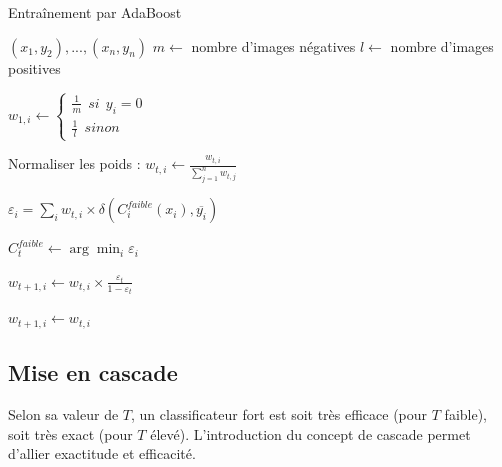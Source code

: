 \documentclass[12pt,a4paper]{article}
\begin{document}
\begin{algorithm}[H]
    \caption{Entraînement par AdaBoost}
    \begin{algorithmic}
        \Input

        $(x_1, y_2), ..., (x_n, y_n)$
        \EndInput
        \State $m \gets$ nombre d'images négatives
        \State $l \gets$ nombre d'images positives
         

            \State $w_{1, i} \gets \begin{cases}
                \frac{1}{m} \:\: si \:\: y_i = 0 \\
                \frac{1}{l} \:\: sinon
                \end{cases}$
        \EndFor

            \State Normaliser les poids : $w_{t, i} \gets \frac{w_{t, i}}{\sum_{j=1}^n w_{t, j}}$


                \State $\varepsilon_i = \sum_i w_{t,i} \times \delta(C_i^{faible}(x_i), \overline{y_i})$ 
            \EndFor

            \State $C_t^{faible} \gets \arg \min_i \varepsilon_i$
             

                \State $w_{t+1, i} \gets w_{t, i} \times \frac{\varepsilon_t}{1- \varepsilon_t}$ 

            \Else
                \State $w_{t+1, i} \gets w_{t, i}$ 
            \EndIf
        \EndFor
        \EndFor
    \end{algorithmic}
\end{algorithm}

\subsection{Mise en cascade}
Selon sa valeur de $T$, un classificateur fort est soit très efficace (pour $T$ faible), soit très exact (pour $T$ élevé). L'introduction du concept de cascade permet d'allier exactitude et efficacité. 
\end{document}
